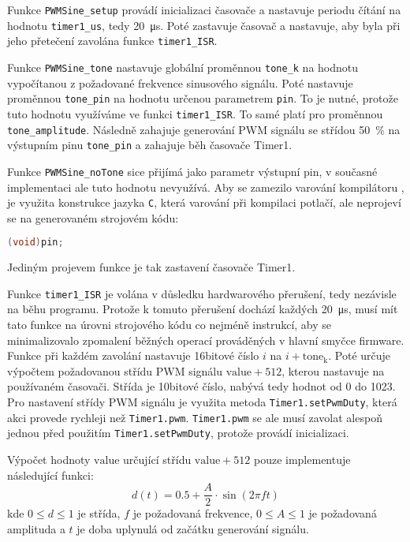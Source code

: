 Funkce \verb|PWMSine_setup| provádí inicializaci časovače a nastavuje periodu
čítání na hodnotu \verb|timer1_us|, tedy \SI{20}{\micro\second}. Poté
zastavuje časovač a nastavuje, aby byla při jeho přetečení zavolána funkce
\verb|timer1_ISR|.

Funkce \verb|PWMSine_tone| nastavuje globální proměnnou \verb|tone_k| na
hodnotu vypočítanou z požadované frekvence sinusového signálu.
Poté nastavuje proměnnou \verb|tone_pin| na hodnotu určenou parametrem
\texttt{pin}. To je nutné, protože tuto hodnotu využíváme ve funkci
\verb|timer1_ISR|. To samé platí pro proměnnou \verb|tone_amplitude|.
Následně zahajuje generování PWM signálu se střídou \SI{50}{\percent} na
výstupním pinu \verb|tone_pin| a zahajuje běh časovače Timer1.

Funkce \verb|PWMSine_noTone| sice přijímá jako parametr výstupní pin,
v současné implementaci ale tuto hodnotu nevyužívá. Aby se zamezilo varování
kompilátoru  ,
je využita konstrukce jazyka \texttt{C}, která varování při kompilaci potlačí,
ale neprojeví se na generovaném strojovém kódu:
\begin{lstlisting}[language=C]
(void)pin;
\end{lstlisting}
Jediným projevem funkce je tak zastavení časovače Timer1.

Funkce \verb|timer1_ISR| je volána v důsledku hardwarového přerušení,
tedy nezávisle na běhu programu. Protože k tomuto přerušení dochází každých
\SI{20}{\micro\second}, musí mít tato funkce na úrovni strojového kódu co
nejméně instrukcí, aby se minimalizovalo zpomalení běžných operací prováděných
v hlavní smyčce firmware. Funkce při každém zavolání nastavuje 16bitové číslo
$i$ na $i + \mathrm{tone_k}$. Poté určuje výpočtem požadovanou střídu PWM
signálu $\mathrm{value}+512$, kterou nastavuje na používaném časovači. Střída
je 10bitové číslo, nabývá tedy hodnot od \num{0} do \num{1023}. Pro nastavení
střídy PWM signálu je využita metoda \texttt{Timer1.setPwmDuty}, která akci
provede rychleji než \texttt{Timer1.pwm}. \texttt{Timer1.pwm} se ale musí
zavolat alespoň jednou před použitím \texttt{Timer1.setPwmDuty}, protože
provádí inicializaci.~\cite[ověřeno praktickým pokusem]{TimerOnedocs}

Výpočet hodnoty $\mathrm{value}$ určující střídu $\mathrm{value}+512$ pouze
implementuje následující funkci:
\begin{equation}
    d(t) = \num{0,5} + \frac{A}{2} \cdot \sin{(2\pi f t)}
    \label{eq:duty float}
\end{equation}
kde $0 \le d \le 1$ je střída, $f$ je požadovaná frekvence, $0 \le A \le 1$ je
požadovaná amplituda a $t$ je doba uplynulá od začátku generování signálu.

